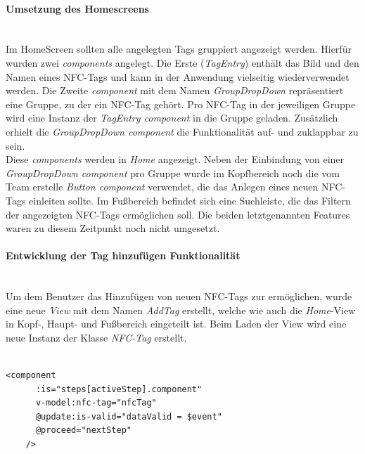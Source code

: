 \documentclass[10pt, a4paper]{article}
\begin{document}
\begin{onehalfspace}
\paragraph*{Umsetzung des Homescreens}$~$ \\
Im HomeScreen sollten alle angelegten Tags gruppiert angezeigt werden. Hierfür wurden zwei \textit{components} angelegt. Die Erste (\textit{TagEntry})
enthält das Bild und den Namen eines NFC-Tags und kann in der Anwendung vielseitig wiederverwendet werden. Die Zweite \textit{component} mit dem Namen
\textit{GroupDropDown} repräsentiert eine Gruppe, zu der ein NFC-Tag gehört.
Pro NFC-Tag in der jeweiligen Gruppe wird eine Instanz der \textit{TagEntry component} in die Gruppe geladen.
Zusätzlich erhielt die \textit{GroupDropDown component} die Funktionalität auf- und
zuklappbar zu sein. \\
Diese \textit{components} werden in \textit{Home} angezeigt. Neben der Einbindung von einer \textit{GroupDropDown component} pro Gruppe
wurde im Kopfbereich noch die vom Team erstelle \textit{Button component} verwendet, die das Anlegen eines neuen NFC-Tags einleiten sollte.
Im Fußbereich befindet sich eine Suchleiste, die das Filtern der angezeigten NFC-Tags ermöglichen soll.
Die beiden letztgenannten Features waren zu diesem Zeitpunkt noch nicht umgesetzt.

\paragraph*{Entwicklung der \glqq Tag hinzufügen\grqq{} Funktionalität}$~$ \\
Um dem Benutzer das Hinzufügen von neuen NFC-Tags zur ermöglichen, wurde eine neue \textit{View} mit dem Namen \textit{AddTag} erstellt, welche wie auch
die \textit{Home}-View in Kopf-, Haupt- und Fußbereich eingeteilt ist. Beim Laden der View wird eine neue Instanz der Klasse \textit{NFC-Tag} erstellt.
\\~\\

\begin{minipage}{\textwidth}
  \begin{lstlisting}[caption={Dynamisches Laden der components von AddTag}, captionpos=b]
    <component
      :is="steps[activeStep].component"
      v-model:nfc-tag="nfcTag"
      @update:is-valid="dataValid = $event"
      @proceed="nextStep"
    />
  \end{lstlisting}
\end{minipage}


\end{onehalfspace}
\end{document}
